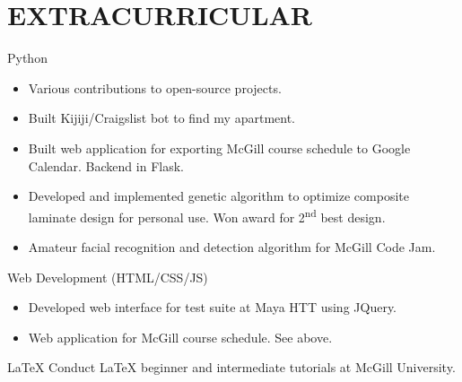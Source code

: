 
\section{EXTRACURRICULAR}

\begin{entrylist}
\entry
{}
{Python}
{}
{\vspace{-\baselineskip}
\begin{itemize}[leftmargin=*]
\item Various contributions to open-source projects.
\item Built Kijiji/Craigslist bot to find my apartment.
\item Built web application for exporting McGill course schedule to Google Calendar. Backend in Flask.
\item Developed and implemented genetic algorithm to optimize composite laminate design for personal use. Won award for 2\textsuperscript{nd} best design.
\item Amateur facial recognition and detection algorithm for McGill Code Jam.
\end{itemize}
}
\entry
{}
{Web Development (HTML/CSS/JS)}
{}
{\vspace{-\baselineskip}
\begin{itemize}[leftmargin=*]
\item Developed web interface for test suite at Maya HTT using JQuery.
\item Web application for McGill course schedule. See above.
\end{itemize}
}
\entry
{}
{LaTeX}
{%
}
{Conduct \LaTeX{} beginner and intermediate tutorials at McGill University.
}
\end{entrylist}




